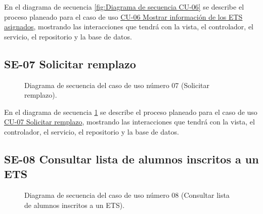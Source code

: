 En el diagrama de secuencia \ref{fig:Diagrama de secuencia CU-06} se describe el proceso planeado para el caso de uso \hyperlink{CU-06}{CU-06 Mostrar información de los ETS asignados}, mostrando las interacciones que tendrá con la vista, el controlador, el servicio, el repositorio y la base de datos.

\newpage

\subsection{SE-07 Solicitar remplazo}

\begin{figure}[htbp!]
	\begin{center}
		\caption{Diagrama de secuencia del caso de uso número 07 (Solicitar remplazo).}
		\label{fig:Diagrama de secuencia CU-07}
	\end{center}
\end{figure}

En el diagrama de secuencia \ref{fig:Diagrama de secuencia CU-07} se describe el proceso planeado para el caso de uso \hyperlink{CU-07}{CU-07 Solicitar remplazo}, mostrando las interacciones que tendrá con la vista, el controlador, el servicio, el repositorio y la base de datos.

\newpage

\subsection{SE-08 Consultar lista de alumnos inscritos a un ETS}

\begin{figure}[htbp!]
	\begin{center}
		\caption{Diagrama de secuencia del caso de uso número 08 (Consultar lista de alumnos inscritos a un ETS).}
		\label{fig:Diagrama de secuencia CU-08}
	\end{center}
\end{figure}

